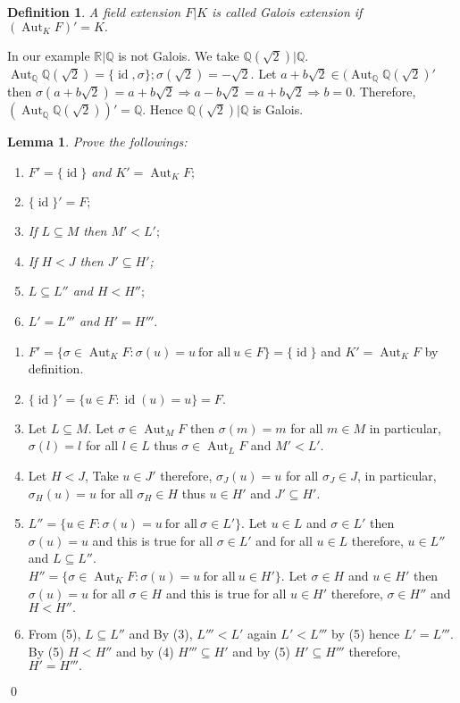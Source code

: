 \documentclass[11pt]{amsart}
\newtheorem{defn}[theorem]{Definition}
\newtheorem{lemma}[theorem]{Lemma}%
\newcommand{\QQ}{\mathbb Q}
\newcommand{\RR}{\mathbb R}
\DeclareMathOperator{\aut}{\text{Aut}}
\DeclareMathOperator{\id}{\text{id}}
\begin{document}
\begin{defn}
A field extension $F|K$ is called Galois extension if $(\aut_KF)'=K.$
\end{defn}
In our example ${\RR}|{\QQ}$ is not Galois. We take ${\QQ}(\sqrt{2})|{\QQ}$. $\aut_{\QQ}{\QQ}(\sqrt{2})=\{\id,\sigma\};\sigma(\sqrt{2})=-\sqrt{2}.$ Let $a+b\sqrt{2}\in (\aut_{\QQ}{\QQ}(\sqrt{2})'$ then $\sigma(a+b\sqrt{2})=a+b\sqrt{2} \Rightarrow a-b\sqrt{2}=a+b\sqrt{2}\Rightarrow b=0$. Therefore, $(\aut_{\QQ}{\QQ}(\sqrt{2}))'={\QQ}.$ Hence ${\QQ}(\sqrt{2})|{\QQ}$ is Galois.

\begin{lemma}
Prove the followings:
\begin{enumerate}
\item $F'=\{\id\}$ and $K'=\aut_KF;$
\item $\{\id\}'=F;$
\item If $L\subseteq M $ then $M'<L';$
\item If $H<J$ then $J'\subseteq H'$;
\item $L\subseteq L''$ and $H<H'';$
\item $L'=L'''$ and $H'=H'''.$
\end{enumerate}
\end{lemma}
\proof \begin{enumerate}
\item $F'=\{\sigma\in\aut_KF:\sigma(u)=u~\text{for all}~u\in F\}=\{\id\}$ and $K'=\aut_KF$ by definition.
\item $\{\id\}'=\{u\in F:\id(u)=u\}=F.$
\item Let $L\subseteq M.$ Let $\sigma\in\aut_MF$ then $\sigma(m)=m$ for all $m\in M$ in particular, $\sigma(l)=l$ for all $l\in L$ thus $\sigma\in \aut_LF$ and $M'<L'.$
\item Let $H<J$, Take $u\in J'$ therefore, $\sigma_J(u)=u$ for all $\sigma_J\in J$, in particular, $\sigma_H(u)=u$ for all $\sigma_H\in H$ thus $u\in H'$ and $J'\subseteq H'.$
\item $L''=\{u\in F:\sigma(u)=u~\text{for all}~\sigma\in L'\}$. Let $u\in L$ and $\sigma\in L'$ then $\sigma(u)=u$ and this is true for all $\sigma\in L'$ and for all $u\in L$ therefore, $u\in L''$ and $L\subseteq L''.$\\
$H''=\{\sigma\in\aut_KF:\sigma(u)=u~\text{for all}~u\in H'\}$. Let $\sigma\in H$ and $u\in H'$ then $\sigma(u)=u$ for all $\sigma\in H$ and this is true for all $u\in H'$ therefore, $\sigma\in H''$ and $H<H''.$
\item From (5), $L\subseteq L''$ and By (3), $L'''<L'$ again $L'<L'''$ by (5) hence $L'=L'''.$ By (5) $H<H''$ and by (4) $H'''\subseteq H'$ and by (5) $H'\subseteq H'''$ therefore, $H'=H'''.$
\end{enumerate}
\qed
\end{document}
